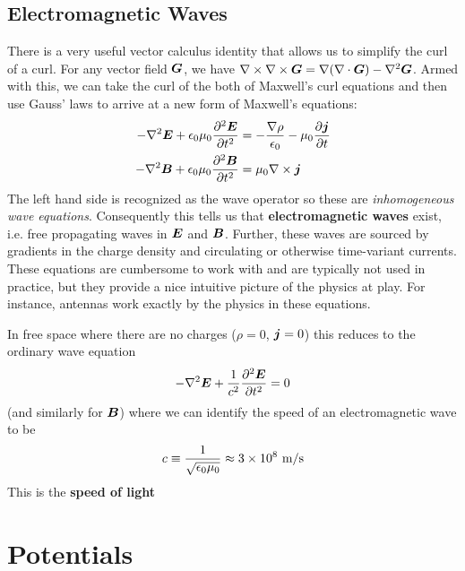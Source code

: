 \documentclass[twocolumn]{gwclass}
\begin{document}
	\subsection{Electromagnetic Waves}
	There is a very useful vector calculus identity that allows us to simplify the curl of a curl. For any vector field $\boldsymbol{G}$, we have $\nabla\times\nabla\times\boldsymbol{G} = \nabla(\nabla\cdot\boldsymbol{G}) - \nabla^2\boldsymbol{G}$. 
	Armed with this, we can take the curl of the both of Maxwell's curl equations and then use Gauss' laws to arrive at a new form of Maxwell's equations:
	\begin{align*} 
		-\nabla^2\boldsymbol{E} + \epsilon_0\mu_0\frac{\partial^2\boldsymbol{E}}{\partial t^2} &= -\frac{\nabla\rho}{\epsilon_0} - \mu_0\frac{\partial \boldsymbol{j}}{\partial t} \\
		 -\nabla^2\boldsymbol{B} + \epsilon_0\mu_0\frac{\partial^2\boldsymbol{B}}{\partial t^2} &= \mu_0\nabla\times\boldsymbol{j} 
	 \end{align*}
	The left hand side is recognized as the wave operator so these are \emph{inhomogeneous wave equations}. Consequently this tells us that \textbf{electromagnetic waves} exist, i.e. free propagating waves in $\boldsymbol{E}$ and $\boldsymbol{B}$. Further, these waves are sourced by gradients in the charge density and circulating or otherwise time-variant currents. These equations are cumbersome to work with and are typically not used in practice, but they provide a nice intuitive picture of the physics at play. For instance, antennas work exactly by the physics in these equations.
	
	In free space where there are no charges ($\rho=0$, $\boldsymbol{j}=0$) this reduces to the ordinary wave equation
	$$ -\nabla^2\boldsymbol{E} + \frac{1}{c^2}\frac{\partial^2\boldsymbol{E}}{\partial t^2} = 0 $$
	(and similarly for $\boldsymbol{B}$) where we can identify the speed of an electromagnetic wave to be
	$$ c\equiv \frac{1}{\sqrt{\epsilon_0\mu_0}} \approx 3\times 10^8 \text{\normalfont{ m/s}} $$
	This is the \textbf{speed of light} 
	

	
	\section{Potentials}
\end{document}
